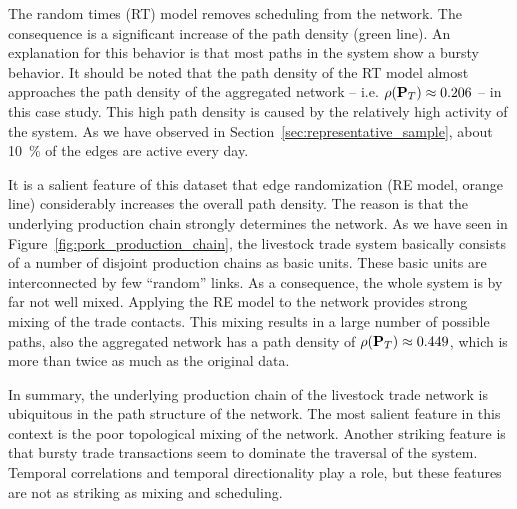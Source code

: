 The random times (RT) model removes scheduling from the network.
The consequence is a significant increase of the path density (green line).
An explanation for this behavior is that most paths in the system show a bursty behavior.
It should be noted that the path density of the RT model almost approaches the path density of the aggregated network -- i.e. $\rho (\mathbf{P}_T)\approx 0.206$ -- in this case study.
This high path density is caused by the relatively high activity of the system.
As we have observed in Section~\ref{sec:representative_sample}, about 10~\% of the edges are active every day.

It is a salient feature of this dataset that edge randomization (RE model, orange line) considerably increases the overall path density.
The reason is that the underlying production chain strongly determines the network.
As we have seen in Figure~\ref{fig:pork_production_chain}, the livestock trade system basically consists of a number of disjoint production chains as basic units.
These basic units are interconnected by few ``random'' links.
As a consequence, the whole system is by far not well mixed.
Applying the RE model to the network provides strong mixing of the trade contacts.
This mixing results in a large number of possible paths, also the aggregated network has a path density of $\rho (\mathbf{P}_T)\approx 0.449$, which is more than twice as much as the original data.

In summary, the underlying production chain of the livestock trade network is ubiquitous in the path structure of the network.
The most salient feature in this context is the poor topological mixing of the network.
Another striking feature is that bursty trade transactions seem to dominate the traversal of the system.
Temporal correlations and temporal directionality play a role, but these features are not as striking as mixing and scheduling.


